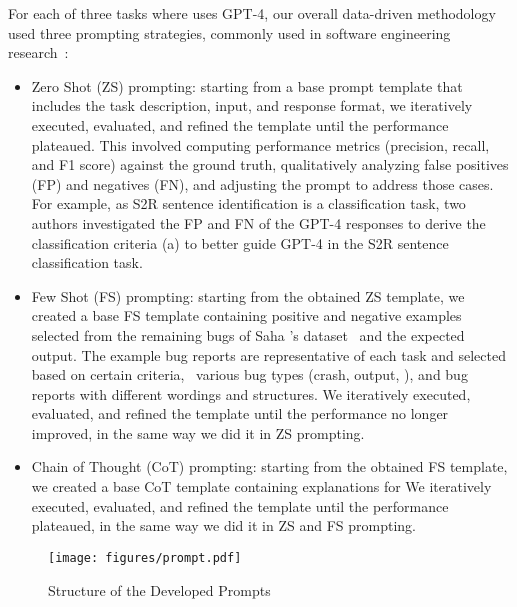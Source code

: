 For each of three tasks where \tool uses GPT-4, our overall data-driven methodology used three prompting strategies, commonly used in software engineering research~\cite{hou2023large}: 
\begin{itemize}
	\item Zero Shot (ZS) prompting: starting from a base prompt template that includes the task description, input, and response format, we iteratively executed, evaluated, and refined the template until the performance plateaued. This involved computing performance metrics (precision, recall, and F1 score) against the ground truth, qualitatively analyzing false positives (FP) and negatives (FN), and adjusting the prompt to address those cases. For example, as S2R sentence identification is a classification task, two authors investigated the FP and FN of the GPT-4 responses to derive the classification criteria (a) to better guide GPT-4 in the S2R sentence classification task.
	\item Few Shot (FS) prompting: starting from the obtained ZS template, we created a base FS template containing positive and negative examples selected from the remaining bugs of Saha \etal's dataset~\cite{saha2024toward} and the expected output. The example bug reports are representative of each task and selected based on certain criteria, \eg\ various bug types (crash, output, \etc), and bug reports with different wordings and structures. We iteratively executed, evaluated, and refined the template until the performance no longer improved, in the same way we did it in ZS prompting.
	\item Chain of Thought (CoT) prompting: starting from the obtained FS template, we created a base CoT template containing explanations for  We iteratively executed, evaluated, and refined the template until the performance plateaued, in the same way we did it in ZS and FS prompting.
\end{itemize}


\begin{figure}
	\centering
	\texttt{[image: figures/prompt.pdf]}
	\caption{Structure of the Developed Prompts}
	\label{fig:prompt-structure}
\end{figure}

